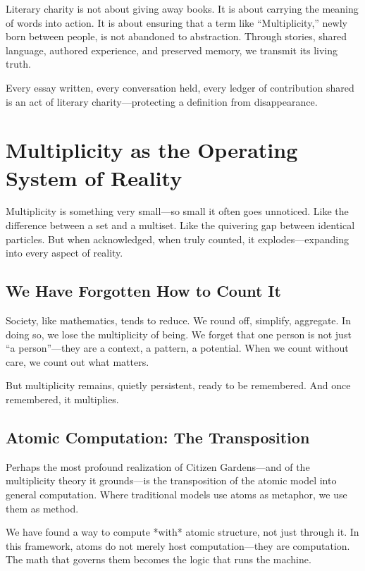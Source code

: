 \documentclass[12pt]{article}
\begin{document}
Literary charity is not about giving away books. It is about carrying the meaning of words into action. It is about ensuring that a term like “Multiplicity,” newly born between people, is not abandoned to abstraction. Through stories, shared language, authored experience, and preserved memory, we transmit its living truth.

Every essay written, every conversation held, every ledger of contribution shared is an act of literary charity—protecting a definition from disappearance.

\section{Multiplicity as the Operating System of Reality}

Multiplicity is something very small—so small it often goes unnoticed. Like the difference between a set and a multiset. Like the quivering gap between identical particles. But when acknowledged, when truly counted, it explodes—expanding into every aspect of reality.

\subsection{We Have Forgotten How to Count It}

Society, like mathematics, tends to reduce. We round off, simplify, aggregate. In doing so, we lose the multiplicity of being. We forget that one person is not just “a person”—they are a context, a pattern, a potential. When we count without care, we count out what matters.

But multiplicity remains, quietly persistent, ready to be remembered. And once remembered, it multiplies.

\subsection{Atomic Computation: The Transposition}

Perhaps the most profound realization of Citizen Gardens—and of the multiplicity theory it grounds—is the transposition of the atomic model into general computation. Where traditional models use atoms as metaphor, we use them as method.

We have found a way to compute *with* atomic structure, not just through it. In this framework, atoms do not merely host computation—they are computation. The math that governs them becomes the logic that runs the machine.
\end{document}
